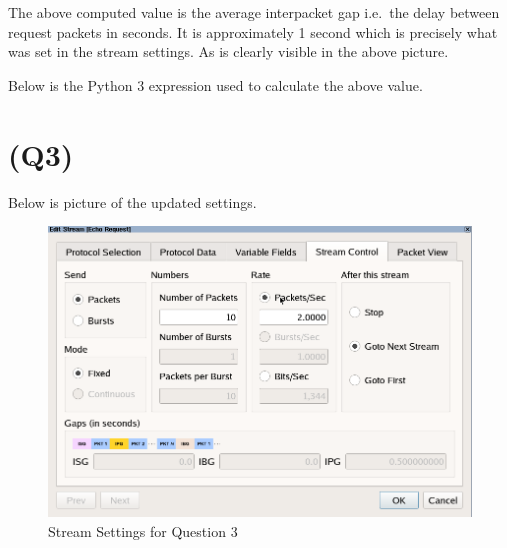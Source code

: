 The above computed value is the average interpacket gap i.e.~the delay
between request packets in seconds. It is approximately 1 second which
is precisely what was set in the stream settings. As is clearly visible
in the above picture.

Below is the Python 3 expression used to calculate the above value.

\begin{Shaded}
\begin{Highlighting}[]
\NormalTok{((} \OperatorTok{{-}} \NormalTok{)}
\OperatorTok{+}\NormalTok{(} \OperatorTok{{-}} \NormalTok{)}
\OperatorTok{+}\NormalTok{(} \OperatorTok{{-}} \NormalTok{)}
\OperatorTok{+}\NormalTok{(} \OperatorTok{{-}} \NormalTok{)}
\OperatorTok{+}\NormalTok{(} \OperatorTok{{-}} \NormalTok{)}
\OperatorTok{+}\NormalTok{(} \OperatorTok{{-}} \NormalTok{)}
\OperatorTok{+}\NormalTok{(} \OperatorTok{{-}} \NormalTok{)}
\OperatorTok{+}\NormalTok{(} \OperatorTok{{-}} \NormalTok{)}
\OperatorTok{+}\NormalTok{(} \OperatorTok{{-}} \NormalTok{))}\OperatorTok{/}
\end{Highlighting}
\end{Shaded}

\hypertarget{q3}{%
\section{(Q3)}\label{q3}}

Below is picture of the updated settings.

\begin{figure}
\centering
\includegraphics{data/q3-stream-settings.png}
\caption{Stream Settings for Question 3}
\end{figure}

